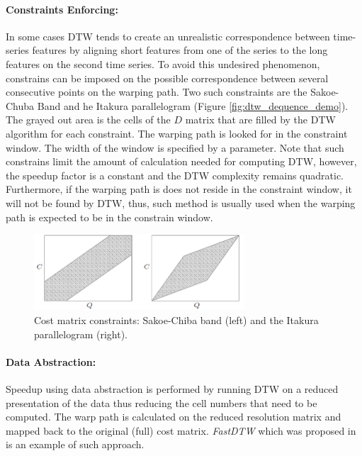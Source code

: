 \paragraph{Constraints Enforcing:} 
In some cases DTW tends to create an unrealistic correspondence between time-series features by aligning short features from one of the series to the long features on the second time series. To avoid this undesired phenomenon, constrains can be imposed on the possible correspondence between several consecutive points on the warping path. Two such constraints are the Sakoe-Chuba Band \cite{sakoe1978dynamic} and he Itakura parallelogram \cite{itakura1975minimum} (Figure \ref{fig:dtw_dequence_demo}). The grayed out area is the cells of the $D$ matrix that are filled by the DTW algorithm for each constraint. The warping path is looked for in the constraint window. The width of the window is specified by a parameter. Note that such constrains limit the amount of calculation needed for computing DTW, however, the speedup factor is a constant and the DTW complexity remains quadratic. Furthermore, if the warping path is does not reside in the constraint window, it will not be found by DTW, thus, such method is usually used when the warping path is expected to be in the constrain window.

\begin{figure}
\centering
\includegraphics[width=0.7\textwidth]{./figures/dtw_sukoe_chuba}       
\caption{Cost matrix constraints: Sakoe-Chiba band (left) and the Itakura parallelogram (right).}
\label{fig:dtw_sukoe_chuba}
\end{figure}

\paragraph{Data Abstraction:} Speedup using data abstraction is performed by running DTW on a reduced presentation of the data thus reducing the cell numbers that need to be computed. The warp path is calculated on the reduced resolution matrix and mapped back to the original (full) cost matrix. \emph{FastDTW} which was proposed in \cite{salvador2007toward} is an example of such approach. 
 
